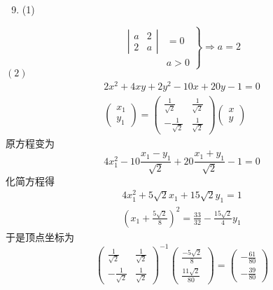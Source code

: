 \documentclass[10pt]{article}
\begin{document}
\begin{enumerate}
  \setcounter{enumi}{8}
  \item (1)
\end{enumerate}
$$
\left.\begin{array}{rl}
\left|\begin{array}{ll}
a & 2 \\
2 & a
\end{array}\right| & =0 \\
& a>0
\end{array}\right\} \Longrightarrow a=2
$$
$(2)$
$$
\begin{gathered}
2 x^{2}+4 x y+2 y^{2}-10 x+20 y-1=0 \\
\left(\begin{array}{l}
x_{1} \\
y_{1}
\end{array}\right)=\left(\begin{array}{rr}
\frac{1}{\sqrt{2}} & \frac{1}{\sqrt{2}} \\
-\frac{1}{\sqrt{2}} & \frac{1}{\sqrt{2}}
\end{array}\right)\left(\begin{array}{l}
x \\
y
\end{array}\right)
\end{gathered}
$$
 原方程变为 
$$
4 x_{1}^{2}-10 \frac{x_{1}-y_{1}}{\sqrt{2}}+20 \frac{x_{1}+y_{1}}{\sqrt{2}}-1=0
$$
 化简方程得 
$$
\begin{gathered}
4 x_{1}^{2}+5 \sqrt{2} x_{1}+15 \sqrt{2} y_{1}=1 \\
\left(x_{1}+\frac{5 \sqrt{2}}{8}\right)^{2}=\frac{33}{32}-\frac{15 \sqrt{2}}{4} y_{1}
\end{gathered}
$$
 于是顶点坐标为 
$$
\left(\begin{array}{cc}
\frac{1}{\sqrt{2}} & \frac{1}{\sqrt{2}} \\
-\frac{1}{\sqrt{2}} & \frac{1}{\sqrt{2}}
\end{array}\right)^{-1}\left(\begin{array}{r}
\frac{-5 \sqrt{2}}{8} \\
\frac{11 \sqrt{2}}{80}
\end{array}\right)=\left(\begin{array}{r}
-\frac{61}{80} \\
-\frac{39}{80}
\end{array}\right)
$$
\end{document}
